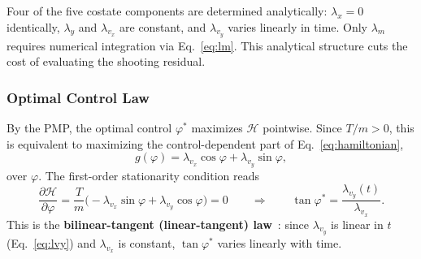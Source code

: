\documentclass[../main.tex]{subfiles}
\begin{document}
Four of the five costate components are determined analytically: $\lambda_x = 0$ identically, $\lambda_y$ and $\lambda_{v_x}$ are constant, and $\lambda_{v_y}$ varies linearly in time. Only $\lambda_m$ requires numerical integration via Eq.~\eqref{eq:lm}. This analytical structure cuts the cost of evaluating the shooting residual.

\subsubsection{Optimal Control Law}

By the PMP, the optimal control $\varphi^*$ maximizes $\mathcal{H}$ pointwise. Since $T/m > 0$, this is equivalent to maximizing the control-dependent part of Eq.~\eqref{eq:hamiltonian},
\begin{equation}
    g(\varphi) = \lambda_{v_x}\cos\varphi + \lambda_{v_y}\sin\varphi,
    \label{eq:gphi}
\end{equation}
over $\varphi$. The first-order stationarity condition reads
\begin{equation}
    \frac{\partial\mathcal{H}}{\partial\varphi} =
    \frac{T}{m}\bigl(-\lambda_{v_x}\sin\varphi + \lambda_{v_y}\cos\varphi\bigr) = 0
    \qquad\Longrightarrow\qquad
    \tan\varphi^* = \frac{\lambda_{v_y}(t)}{\lambda_{v_x}}.
    \label{eq:bilinear}
\end{equation}
This is the \textbf{bilinear-tangent (linear-tangent) law}~\cite[Sec.~2.4]{bryson1975}: since $\lambda_{v_y}$ is linear in $t$ (Eq.~\ref{eq:lvy}) and $\lambda_{v_x}$ is constant, $\tan\varphi^*$ varies linearly with time.
\end{document}
